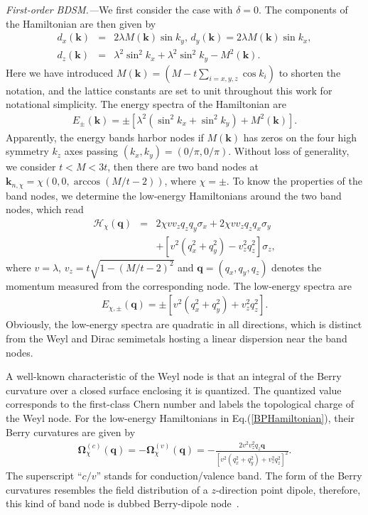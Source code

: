 \documentclass[aps,prl,twocolumn,longbibliography]{revtex4-1}
\newcommand{\bk}{\boldsymbol k}
\newcommand{\bq}{\boldsymbol q}
\begin{document}
{\it First-order BDSM.---}We first consider the case with $\delta=0$.
The components of the Hamiltonian are then given by
\begin{eqnarray}
d_{x}(\bk)&=&2\lambda M(\bk)\sin k_{y},\,d_{y}(\bk)=2\lambda M(\bk)\sin k_{x},\nonumber\\
d_{z}(\bk)&=&\lambda^{2}\sin^{2}k_{x}+\lambda^{2}\sin^{2}k_{y}-M^{2}(\bk).\label{FH}
\end{eqnarray}
Here we have introduced $M(\bk)=(M-t\sum_{i=x,y,z}\cos k_{i})$ to shorten the notation,
and the lattice constants are set to unit throughout this work for notational simplicity.
The energy spectra of the Hamiltonian are
\begin{eqnarray}
E_{\pm}(\bk)=\pm[\lambda^{2}(\sin^{2}k_{x}+\sin^{2}k_{y})+M^{2}(\bk)].
\end{eqnarray}
Apparently, the energy bands harbor nodes if $M(\bk)$ has zeros on the four high symmetry
$k_{z}$ axes passing $(k_{x},k_{y})=(0/\pi,0/\pi)$. Without loss of generality, we consider
$t<M<3t$, then there are two band nodes  at $\bk_{n,\chi}=\chi(0,0,\arccos (M/t-2))$, where
$\chi=\pm$. To know the properties of the band nodes, we determine the low-energy Hamiltonians around the two band nodes, which
read
\begin{eqnarray}
\mathcal{H}_{\chi}(\bq)&=&2\chi vv_{z}q_{z}q_{y}\sigma_{x}+2\chi vv_{z}q_{z} q_{x}\sigma_{y}\nonumber\\
&&+[v^{2}(q_{x}^{2}+q_{y}^{2})-v_{z}^{2}q_{z}^{2}]\sigma_{z},\label{BPHamiltonian}
\end{eqnarray}
where $v=\lambda$, $v_{z}=t\sqrt{1-(M/t-2)^{2}}$ and $\bq=(q_{x},q_{y},q_{z})$ denotes
the momentum measured from the corresponding node. The low-energy spectra are
\begin{eqnarray}
E_{\chi,\pm}(\bq)=\pm[v^{2}(q_{x}^{2}+q_{y}^{2})+v_{z}^{2}q_{z}^{2}].
\end{eqnarray}
Obviously, the low-energy spectra are quadratic in all directions,
which is distinct from the Weyl and Dirac semimetals
hosting a linear dispersion near the band nodes.


A well-known characteristic of the Weyl node is that an integral of the Berry curvature
over a closed surface enclosing it is quantized. The quantized value corresponds to
the first-class Chern number and labels the topological charge of the Weyl node.
For the low-energy Hamiltonians in Eq.(\ref{BPHamiltonian}), their Berry curvatures are
given by~\cite{Zhuang2023NLHE}
\begin{eqnarray}
\boldsymbol{\Omega}_{\chi}^{(c)}(\bq)=-\boldsymbol{\Omega}_{\chi}^{(v)}(\bq)
=-\frac{2v^{2}v_{z}^{2}q_{z}\bq}{[v^{2}(q_{x}^{2}+q_{y}^{2})+v_{z}^{2}q_{z}^{2}]^{2}}.\label{BC}
\end{eqnarray}
The superscript ``$c/v$'' stands for conduction/valence band.
The form of the Berry curvatures resembles
the field distribution of a $z$-direction point dipole,
therefore, this kind of band node is dubbed Berry-dipole node~\cite{Nelson2021hopf,Graf2023Hopf}.
\end{document}
